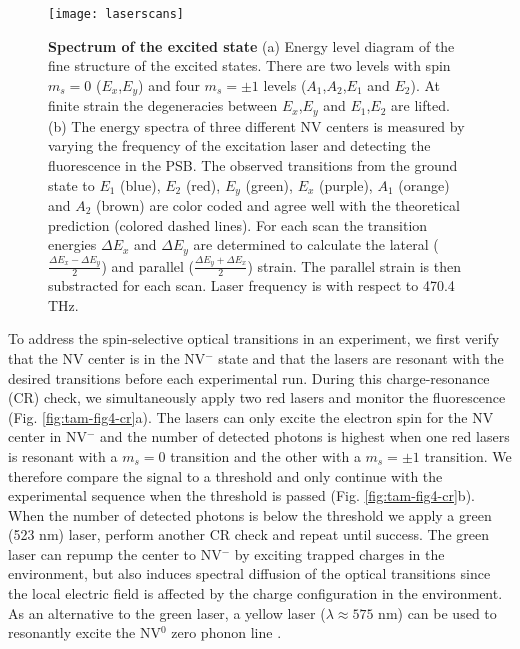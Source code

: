 \begin{figure*}
	\centering
	\texttt{[image: laserscans]}
	\caption{\label{fig:tam-fig4-laserscan} \textbf{Spectrum of the excited state} (a) Energy level diagram of the fine structure of the excited states. There are two levels with spin $m_s = 0$ ($E_x$,$E_y$) and four $m_s = \pm 1$ levels ($A_1$,$A_2$,$E_1$ and $E_2$). At finite strain the degeneracies between $E_x$,$E_y$ and $E_1$,$E_2$ are lifted. (b) The energy spectra of three different NV centers is measured by varying the frequency of the excitation laser and detecting the fluorescence in the PSB. The observed transitions from the ground state to $E_1$ (blue), $E_2$ (red), $E_y$ (green), $E_x$ (purple), $A_1$ (orange) and $A_2$ (brown) are color coded and agree well with the theoretical prediction (colored dashed lines). For each scan the transition energies $\Delta E_x$ and $\Delta E_y$ are determined to calculate the lateral ($\frac{\Delta E_x-\Delta E_y}{2}$) and parallel ($\frac{\Delta E_y+\Delta E_x}{2}$) strain. The parallel strain is then substracted for each scan. Laser frequency is with respect to 470.4 THz.}
\end{figure*}

To address the spin-selective optical transitions in an experiment, we first verify that the NV center is in the NV$^-$ state and that the lasers are resonant with the desired transitions before each experimental run. During this charge-resonance (CR) check, we simultaneously apply two red lasers and monitor the fluorescence (Fig. \ref{fig:tam-fig4-cr}a). The lasers can only excite the electron spin for the NV center in NV$^-$ and the number of detected photons is highest when one red lasers is resonant with a $m_s = 0$ transition and the other with a $m_s=\pm1$ transition. We therefore compare the signal to a threshold and only continue with the experimental sequence when the threshold is passed (Fig. \ref{fig:tam-fig4-cr}b). When the number of detected photons is below the threshold we apply a green (523 nm) laser, perform another CR check and repeat until success. The green laser can repump the center to NV$^-$ by exciting trapped charges in the environment, but also induces spectral diffusion of the optical transitions since the local electric field is affected by the charge configuration in the environment. As an alternative to the green laser, a yellow laser ($\lambda \approx 575$ nm) can be used to resonantly excite the NV$^0$ zero phonon line \cite{Siyushev_Phys.Rev.Lett._2013}. 

